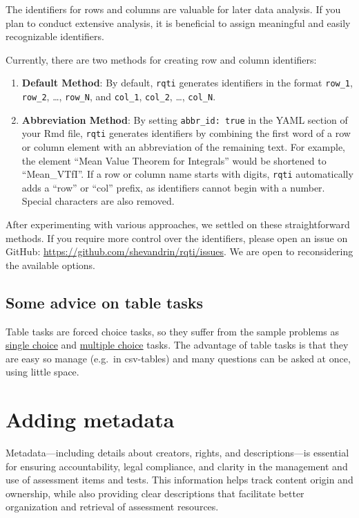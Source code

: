 \documentclass[twoside]{tufte-book}
\providecommand{\tightlist}{%
  \setlength{\itemsep}{0pt}\setlength{\parskip}{0pt}}
\begin{document}
The identifiers for rows and columns are valuable for later data analysis. If you plan to conduct extensive analysis, it is beneficial to assign meaningful and easily recognizable identifiers.

Currently, there are two methods for creating row and column identifiers:

\begin{enumerate}
\def\labelenumi{\arabic{enumi}.}
\tightlist
\item
  \textbf{Default Method}: By default, \texttt{rqti} generates identifiers in the format \texttt{row\_1}, \texttt{row\_2}, \ldots, \texttt{row\_N}, and \texttt{col\_1}, \texttt{col\_2}, \ldots, \texttt{col\_N}.
\item
  \textbf{Abbreviation Method}: By setting \texttt{abbr\_id:\ true} in the YAML section of your Rmd file, \texttt{rqti} generates identifiers by combining the first word of a row or column element with an abbreviation of the remaining text. For example, the element ``Mean Value Theorem for Integrals'' would be shortened to ``Mean\_VTfI''. If a row or column name starts with digits, \texttt{rqti} automatically adds a ``row'' or ``col'' prefix, as identifiers cannot begin with a number. Special characters are also removed.
\end{enumerate}

After experimenting with various approaches, we settled on these straightforward methods. If you require more control over the identifiers, please open an issue on GitHub: \url{https://github.com/shevandrin/rqti/issues}. We are open to reconsidering the available options.

\section{Some advice on table tasks}\label{some-advice-on-table-tasks}

Table tasks are forced choice tasks, so they suffer from the sample problems as \href{singlechoice.html}{single choice} and \href{multiplechoice.html}{multiple choice} tasks. The advantage of table tasks is that they are easy so manage (e.g.~in csv-tables) and many questions can be asked at once, using little space.

\chapter{Adding metadata}\label{adding-metadata}

Metadata---including details about creators, rights, and descriptions---is essential for ensuring accountability, legal compliance, and clarity in the management and use of assessment items and tests. This information helps track content origin and ownership, while also providing clear descriptions that facilitate better organization and retrieval of assessment resources.
\end{document}

